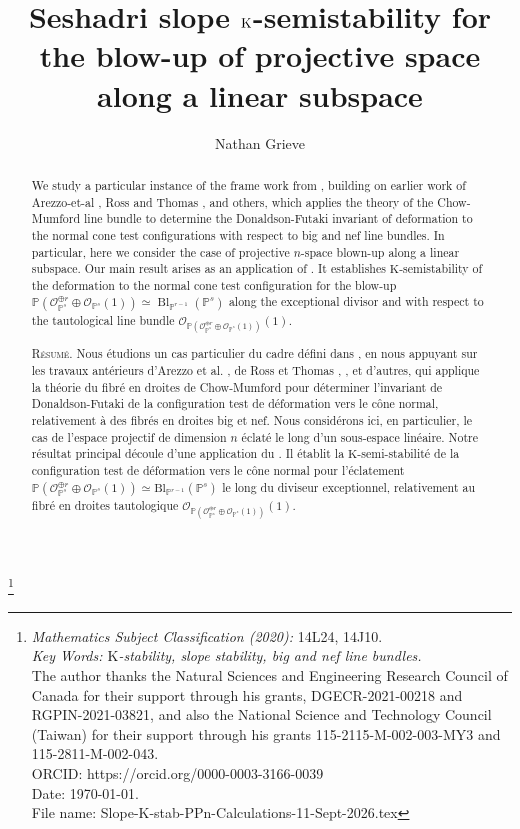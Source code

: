 \documentclass[10pt,letterpaper]{amsart}
\title[Slope $\K$-semistability along a linear subspace]{Seshadri slope $\K$-semistability for the blow-up of projective space along a linear subspace}
\author{Nathan Grieve}
\newcommand{\filename}{Slope-K-stab-PPn-Calculations-11-Sept-2026.tex}
\newcommand{\Osh}{{\mathcal O}}                        %
\newcommand{\K}{\mathrm{K}}
\newcommand{\PP}{\mathbb{P}} %
\theoremstyle{definition}
\numberwithin{equation}{section}
\begin{document}
\begin{abstract}
We study a particular instance of the frame work from \cite{Grieve:CM:Line:Slope:Stab}, building on earlier work of Arezzo-et-al \cite{Arezzo:DellaVedova:LaNave}, Ross and Thomas \cite{Ross:Thomas:2007}, \cite{Ross:Thomas:2006} and others, which applies the theory of the Chow-Mumford line bundle to determine the Donaldson-Futaki invariant of deformation to the normal cone test configurations with respect to big and nef line bundles.  In particular, here we consider the case of projective $n$-space blown-up along a linear subspace.  Our main result arises as an application of  \cite[Theorem 1.1]{Grieve:CM:Line:Slope:Stab}.  It establishes $\K$-semistability of the deformation to the normal cone test configuration for the blow-up $\PP(\Osh_{\PP^s}^{\oplus r} \oplus \Osh_{\PP^s}(1)) \simeq \operatorname{Bl}_{\PP^{r-1}}(\PP^s)$ along the exceptional divisor and with respect to the tautological line bundle $\Osh_{\PP(\Osh_{\PP^s}^{\oplus r} \oplus \Osh_{\PP^s}(1))}(1)$.


\medskip

\noindent\textsc{R\'esum\'e.}
Nous \'{e}tudions un cas particulier du cadre d\'efini dans \cite{Grieve:CM:Line:Slope:Stab}, en nous appuyant sur les travaux ant\'{e}rieurs d'Arezzo et al. \cite{Arezzo:DellaVedova:LaNave}, de Ross et Thomas \cite{Ross:Thomas:2007}, \cite{Ross:Thomas:2006}, et d'autres, qui applique la th\'eorie du fibr\'e en droites de Chow-Mumford pour d\'eterminer l'invariant de Donaldson-Futaki de la configuration test de d\'eformation vers le c\^one normal, relativement \`a des fibr\'es en droites big et nef. Nous consid\'erons ici, en particulier, le cas de l'espace projectif de dimension $n$ \'eclat\'e le long d'un sous-espace lin\'{e}aire. Notre r\'{e}sultat principal d\'{e}coule d'une application du \cite[Theorem 1.1]{Grieve:CM:Line:Slope:Stab}. Il \'etablit la $\K$-semi-stabilit\'e de la configuration test de d\'{e}formation vers le c\^one normal pour l'\'{e}clatement $\mathbb{P}(\mathcal{O}_{\mathbb{P}^s}^{\oplus r} \oplus \mathcal{O}_{\mathbb{P}^s}(1)) \simeq \text{Bl}_{\mathbb{P}^{r-1}}(\mathbb{P}^s)$ le long du diviseur exceptionnel, relativement au fibr\'{e} en droites tautologique $\mathcal{O}_{\mathbb{P}(\mathcal{O}_{\mathbb{P}^s}^{\oplus r} \oplus \mathcal{O}_{\mathbb{P}^s}(1))}(1)$.
\end{abstract}


\thanks{
\emph{Mathematics Subject Classification (2020):}  14L24, 14J10.  \\
\emph{Key Words: $\K$-stability, slope stability, big and nef line bundles. }  \\
The author thanks the Natural Sciences and Engineering Research Council of Canada for their support through his grants, DGECR-2021-00218 and RGPIN-2021-03821, and also the National Science and Technology Council (Taiwan) for their support through his grants 115-2115-M-002-003-MY3 and 115-2811-M-002-043.\\
ORCID: https://orcid.org/0000-0003-3166-0039
\\
Date: \today.  \\
File name: \filename}
\end{document}

